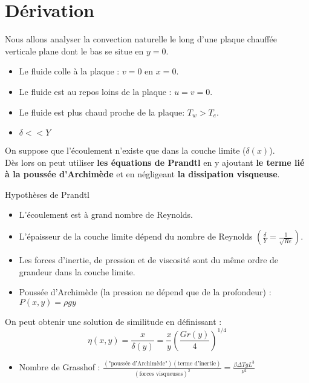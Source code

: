 \section{Dérivation}

\noindent Nous allons analyser la convection naturelle le long d'une plaque chauffée verticale plane dont le bas se situe en $y=0$.

\begin{itemize}
  \item Le fluide colle à la plaque : $v = 0$ en $x = 0$.
  \item Le fluide est au repos loins de la plaque : $u = v = 0$.
  \item Le fluide est plus chaud proche de la plaque: $T_w > T_e$.
  \item $\delta << Y$
\end{itemize}

\noindent On suppose que l'écoulement n'existe que dans la couche limite ($\delta(x)$). \\
Dès lors on peut utiliser \textbf{les équations de Prandtl} en y ajoutant \textbf{le terme lié à la poussée d'Archimède} et en négligeant \textbf{la dissipation visqueuse}.

\noindent Hypothèses de Prandtl

\begin{itemize}
  \item L'écoulement est à grand nombre de Reynolds.
  \item L'épaisseur de la couche limite dépend du nombre de Reynolds $(\frac{\delta}{Y} = \frac{1}{\sqrt{Re}})$.
  \item Les forces d'inertie, de pression et de viscosité sont du même ordre de grandeur dans la couche limite.
\end{itemize}

\begin{itemize}
  \item Poussée d'Archimède (la pression ne dépend que de la profondeur) : $P(x, y) = \rho g y$
\end{itemize}

\noindent On peut obtenir une solution de similitude en définissant :
\begin{equation}
  \eta(x,y) = \frac{x}{\delta(y)} = \frac{x}{y} \left( \frac{Gr(y)}{4} \right)^{1/4}
\end{equation}

\begin{itemize}
  \item Nombre de Grasshof : $\frac{(\text{"poussée d'Archimède"})(\text{terme d'inertie})}{(\text{forces visqueuses})^2} = \frac{\beta \Delta T g L^3}{\nu^2}$
\end{itemize}

